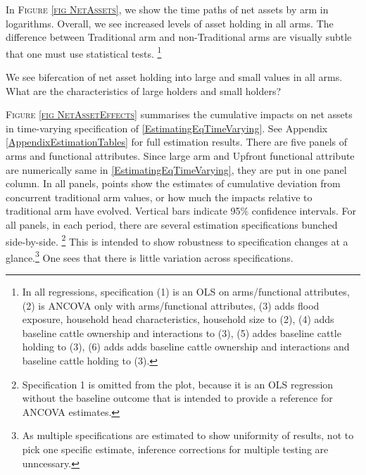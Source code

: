 	In \textsc{\footnotesize Figure \ref{fig NetAssets}}, we show the time paths of net assets by arm in logarithms. Overall, we see increased levels of asset holding in all arms. The difference between \textsf{Traditional} arm and non-\textsf{Traditional} arms are visually subtle that one must use statistical tests. \footnote{In all regressions, specification (1) is an OLS on arms/functional attributes, (2) is ANCOVA only with arms/functional attributes, (3) adds flood exposure, household head characteristics, household size to (2), (4) adds baseline cattle ownership and interactions to (3), (5) addes baseline cattle holding to (3), (6) adds adds baseline cattle ownership and interactions and baseline cattle holding to (3). } 

We see bifercation of net asset holding into large and small values in all arms. What are the characteristics of large holders and small holders?


	\textsc{\footnotesize Figure \ref{fig NetAssetEffects}} summarises the cumulative impacts on net assets in time-varying specification of \eqref{EstimatingEqTimeVarying}.  See Appendix \ref{AppendixEstimationTables} for full estimation results. There are five panels of arms and functional attributes. Since \textsf{large} arm and \textsf{Upfront} functional attribute are numerically same in \eqref{EstimatingEqTimeVarying}, they are put in one panel column. In all panels, points show the estimates of cumulative deviation from concurrent \textsf{traditional} arm values, or how much the impacts relative to \textsf{traditional} arm have evolved. Vertical bars indicate 95\% confidence intervals. 
	For all panels, in each period, there are several estimation specifications bunched side-by-side. \footnote{Specification 1 is omitted from the plot, because it is an OLS regression without the baseline outcome that is intended to provide a reference for ANCOVA estimates. } This is intended to show robustness to specification changes at a glance.\footnote{As multiple specifications are estimated to show uniformity of results, not to pick one specific estimate, inference corrections for multiple testing are unncessary. } One sees that there is little variation across specifications. %
	

